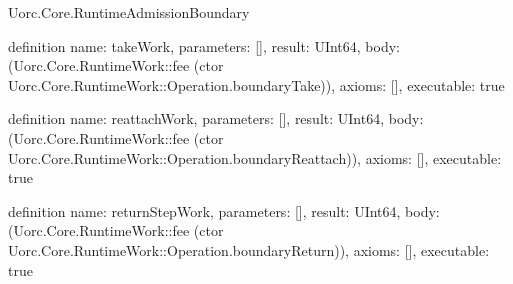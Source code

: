 \begin{lexlean}{Uorc.Core.RuntimeAdmissionBoundary}
\begin{semanticmodule}
definition{
  name: takeWork,
  parameters: [],
  result: UInt64,
  body: (Uorc.Core.RuntimeWork::fee (ctor Uorc.Core.RuntimeWork::Operation.boundaryTake)),
  axioms: [],
  executable: true
}

definition{
  name: reattachWork,
  parameters: [],
  result: UInt64,
  body: (Uorc.Core.RuntimeWork::fee (ctor Uorc.Core.RuntimeWork::Operation.boundaryReattach)),
  axioms: [],
  executable: true
}

definition{
  name: returnStepWork,
  parameters: [],
  result: UInt64,
  body: (Uorc.Core.RuntimeWork::fee (ctor Uorc.Core.RuntimeWork::Operation.boundaryReturn)),
  axioms: [],
  executable: true
}
\end{semanticmodule}
\end{lexlean}
